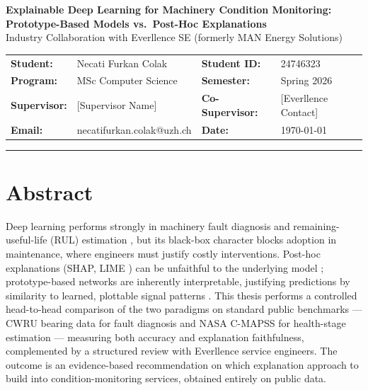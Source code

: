 \documentclass[10pt,a4paper]{article}
\begin{document}
\begin{center}
    {\large \textbf{Explainable Deep Learning for Machinery Condition Monitoring:\\[0.1em]Prototype-Based Models vs.\ Post-Hoc Explanations}}\\[0.2em]
    {\small Industry Collaboration with Everllence SE (formerly MAN Energy Solutions)}
\end{center}

\vspace{0.2em}

\noindent
{\small
\begin{tabularx}{\textwidth}{>{\bfseries}l X >{\bfseries}l X}
Student: & Necati Furkan Colak & Student ID: & 24746323 \\
Program: & MSc Computer Science & Semester: & Spring 2026 \\
Supervisor: & [Supervisor Name] & Co-Supervisor: & [Everllence Contact] \\
Email: & necatifurkan.colak@uzh.ch & Date: & \today \\
\end{tabularx}}

\vspace{0.3em}
\hrule
\vspace{0.3em}

\section{Abstract}

Deep learning performs strongly in machinery fault diagnosis and remaining-useful-life (RUL) estimation \cite{fink2020}, but its black-box character blocks adoption in maintenance, where engineers must justify costly interventions. Post-hoc explanations (SHAP, LIME \cite{lundberg2017shap}) can be unfaithful to the underlying model \cite{rudin2019}; prototype-based networks are inherently interpretable, justifying predictions by similarity to learned, plottable signal patterns \cite{chen2019protopnet, gee2019prototypes}. This thesis performs a controlled head-to-head comparison of the two paradigms on standard public benchmarks --- CWRU bearing data \cite{smith2015cwru} for fault diagnosis and NASA C-MAPSS \cite{saxena2008cmapss} for health-stage estimation --- measuring both accuracy and explanation faithfulness, complemented by a structured review with Everllence service engineers. The outcome is an evidence-based recommendation on which explanation approach to build into condition-monitoring services, obtained entirely on public data.
\end{document}
